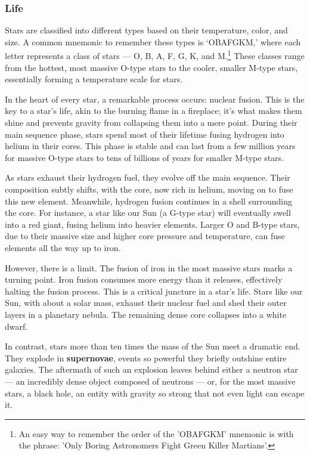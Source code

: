\subsubsection{Life}
Stars are classified into different types based on their temperature, color, and size. A common mnemonic to remember these types is `OBAFGKM,' where each letter represents a class of stars — O, B, A, F, G, K, and M.\footnote{An easy way to remember the order of the 'OBAFGKM' mnemonic is with the phrase: 'Only Boring Astronomers Fight Green Killer Martians'.} These classes range from the hottest, most massive O-type stars to the cooler, smaller M-type stars, essentially forming a temperature scale for stars.

In the heart of every star, a remarkable process occurs: nuclear fusion. This is the key to a star's life, akin to the burning flame in a fireplace; it's what makes them shine and prevents gravity from collapsing them into a mere point. During their main sequence phase, stars spend most of their lifetime fusing hydrogen into helium in their cores. This phase is stable and can last from a few million years for massive O-type stars to tens of billions of years for smaller M-type stars.

As stars exhaust their hydrogen fuel, they evolve off the main sequence. Their composition subtly shifts, with the core, now rich in helium, moving on to fuse this new element. Meanwhile, hydrogen fusion continues in a shell surrounding the core. For instance, a star like our Sun (a G-type star) will eventually swell into a red giant, fusing helium into heavier elements. Larger O and B-type stars, due to their massive size and higher core pressure and temperature, can fuse elements all the way up to iron.

However, there is a limit. The fusion of iron in the most massive stars marks a turning point. Iron fusion consumes more energy than it releases, effectively halting the fusion process. This is a critical juncture in a star's life. Stars like our Sun, with about a solar mass, exhaust their nuclear fuel and shed their outer layers in a planetary nebula. The remaining dense core collapses into a white dwarf.

In contrast, stars more than ten times the mass of the Sun meet a dramatic end. They explode in \textbf{supernovae}, events so powerful they briefly outshine entire galaxies. The aftermath of such an explosion leaves behind either a neutron star — an incredibly dense object composed of neutrons — or, for the most massive stars, a black hole, an entity with gravity so strong that not even light can escape it.


